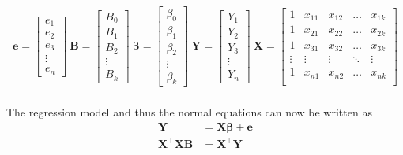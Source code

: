 \begin{align}
	\textbf{e} = 
	\begin{bmatrix}
		e_1 \\
		e_2 \\
		e_3 \\
		\vdots \\
		e_n
	\end{bmatrix}
	\ \textbf{B} = 
	\begin{bmatrix}
		B_0 \\
		B_1 \\
		B_2 \\
		\vdots \\
		B_k
	\end{bmatrix}
	\ \boldsymbol{\beta} = 
	\begin{bmatrix}
		\beta_0 \\
		\beta_1 \\
		\beta_2 \\
		\vdots \\
		\beta_k
	\end{bmatrix}
	\ \textbf{Y} = 
	\begin{bmatrix}
		Y_1 \\
		Y_2 \\
		Y_3 \\
		\vdots \\
		Y_n
	\end{bmatrix}
	\ \textbf{X} = 
	\begin{bmatrix}
		1 & x_{11} & x_{12} & \dots & x_{1k}\\
		1 & x_{21} & x_{22} & \dots & x_{2k}\\
		1 & x_{31} & x_{32} & \dots & x_{3k}\\
		\vdots & \vdots & \vdots & \ddots & \vdots \\
		1 & x_{n1} & x_{n2} & \dots & x_{nk}\\
	\end{bmatrix} 
\end{align}\\

The regression model and thus the normal equations can now be written as \\

\begin{align}
	\textbf{Y} &= \textbf{X} \boldsymbol{\beta} + \textbf{e} \\
	\textbf{X}^\intercal \textbf{X} \textbf{B} &= \textbf{X}^\intercal \textbf{Y} 
\end{align}\\

